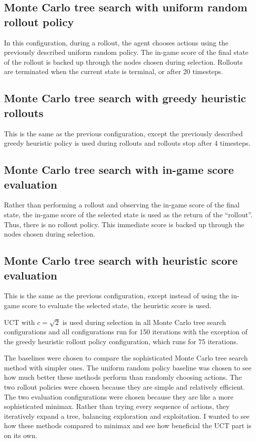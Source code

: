 \documentclass[letterpaper]{article} %
\begin{document}
\subsection{Monte Carlo tree search with uniform random rollout policy}
In this configuration, during a rollout, the agent chooses actions using the previously described uniform random policy. The in-game score of the final state of the rollout is backed up through the nodes chosen during selection. Rollouts are terminated when the current state is terminal, or after 20 timesteps.

\subsection{Monte Carlo tree search with greedy heuristic rollouts}
This is the same as the previous configuration, except the previously described greedy heuristic policy is used during rollouts and rollouts stop after 4 timesteps.

\subsection{Monte Carlo tree search with in-game score evaluation}
Rather than performing a rollout and observing the in-game score of the final state, the in-game score of the selected state is used as the return of the ``rollout''. Thus, there is no rollout policy. This immediate score is backed up through the nodes chosen during selection.

\subsection{Monte Carlo tree search with heuristic score evaluation}
This is the same as the previous configuration, except instead of using the in-game score to evaluate the selected state, the heuristic score is used.

UCT with \(c=\sqrt{2}\) is used during selection in all Monte Carlo tree search configurations and all configurations run for 150 iterations with the exception of the greedy heuristic rollout policy configuration, which runs for 75 iterations.

The baselines were chosen to compare the sophisticated Monte Carlo tree search method with simpler ones. The uniform random policy baseline was chosen to see how much better these methods perform than randomly choosing actions. The two rollout policies were chosen because they are simple and relatively efficient. The two evaluation configurations were chosen because they are like a more sophisticated minimax. Rather than trying every sequence of actions, they iteratively expand a tree, balancing exploration and exploitation. I wanted to see how these methods compared to minimax and see how beneficial the UCT part is on its own.
\end{document}
